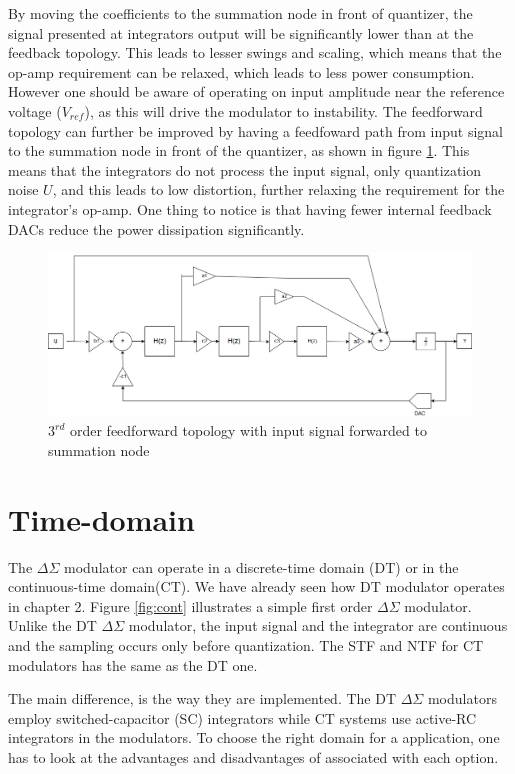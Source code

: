 By moving the coefficients to the summation node in front of quantizer, the signal presented at integrators output will be significantly lower than at the feedback topology. This leads to lesser swings and scaling, which means that the op-amp requirement can be relaxed, which leads to less power consumption. However one should be aware of operating on input amplitude near the reference voltage ($V_{ref}$), as this will drive the modulator to instability. The feedforward topology can further be improved by having a feedfoward path from input signal to the summation node in front of the quantizer, as shown in figure \ref{fig:input}. This means that the integrators do not process the input signal, only quantization noise $U$, and this leads to low distortion\cite[Ch.4.4.2]{Richard}, further relaxing the requirement for the integrator's op-amp. One thing to notice is that having fewer internal feedback DACs reduce the power dissipation significantly. 

\begin{figure}\label{final_top}
\centering
\includegraphics[scale=0.38]{images/feedforward.png}
\caption{$3^{rd}$ order feedforward topology with input signal forwarded to summation node}
\label{fig:input}
\end{figure}

\section{Time-domain}
The $\Delta\Sigma$ modulator can operate in a discrete-time domain (DT) or in the continuous-time domain(CT)\cite{Richard}. We have already seen how DT modulator operates in chapter 2. Figure \ref{fig:cont} illustrates a simple first order $\Delta\Sigma$ modulator. Unlike the DT $\Delta\Sigma$ modulator, the input signal and the integrator are continuous and the sampling occurs only before quantization. The STF and NTF for CT modulators has the same as the DT one.    

The main difference, is the way they are implemented. The DT $\Delta\Sigma$ modulators employ switched-capacitor (SC) integrators while CT systems use active-RC integrators in the modulators. To choose the right domain for a application, one has to look at the advantages and disadvantages of associated with each option.

